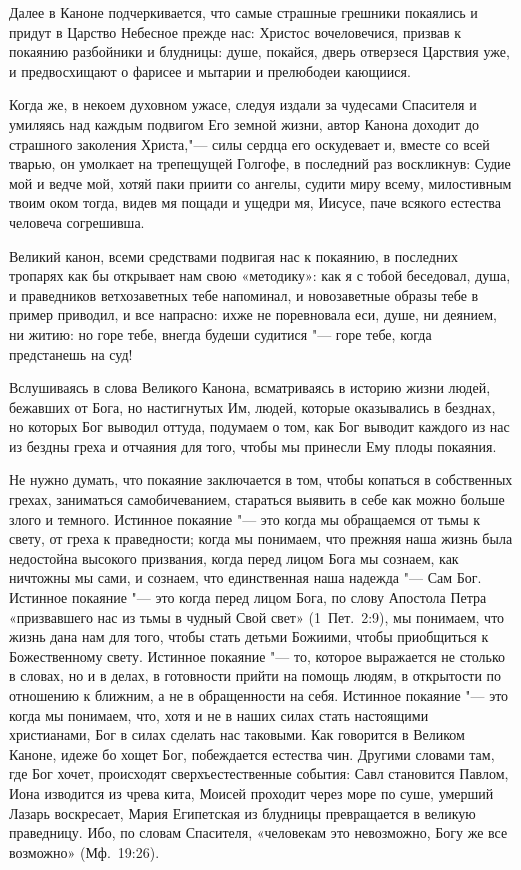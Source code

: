 \begin{mymulticols}
Далее в Каноне подчеркивается, что самые страшные грешники покаялись и придут в Царство Небесное прежде нас: Христос вочеловечися, призвав к покаянию разбойники и блудницы: душе, покайся, дверь отверзеся Царствия уже, и предвосхищают о фарисее и мытарии и прелюбодеи кающиися.

Когда же, в некоем духовном ужасе, следуя издали за чудесами Спасителя и умиляясь над каждым подвигом Его земной жизни, автор Канона доходит до страшного заколения Христа,"--- силы сердца его оскудевает и, вместе со всей тварью, он умолкает на трепещущей Голгофе, в последний раз воскликнув: Судие мой и ведче мой, хотяй паки приити со ангелы, судити миру всему, милостивным твоим оком тогда, видев мя пощади и ущедри мя, Иисусе, паче всякого естества человеча согрешивша.

Великий канон, всеми средствами подвигая нас к покаянию, в последних тропарях как бы открывает нам свою «методику»: как я с тобой беседовал, душа, и праведников ветхозаветных тебе напоминал, и новозаветные образы тебе в пример приводил, и все напрасно: ихже не поревновала еси, душе, ни деянием, ни житию: но горе тебе, внегда будеши судитися "--- горе тебе, когда предстанешь на суд!

Вслушиваясь в слова Великого Канона, всматриваясь в историю жизни людей, бежавших от Бога, но настигнутых Им, людей, которые оказывались в безднах, но которых Бог выводил оттуда, подумаем о том, как Бог выводит каждого из нас из бездны греха и отчаяния для того, чтобы мы принесли Ему плоды покаяния.

Не нужно думать, что покаяние заключается в том, чтобы копаться в собственных грехах, заниматься самобичеванием, стараться выявить в себе как можно больше злого и темного. Истинное покаяние "--- это когда мы обращаемся от тьмы к свету, от греха к праведности; когда мы понимаем, что прежняя наша жизнь была недостойна высокого призвания, когда перед лицом Бога мы сознаем, как ничтожны мы сами, и сознаем, что единственная наша надежда "--- Сам Бог. Истинное покаяние "--- это когда перед лицом Бога, по слову Апостола Петра «призвавшего нас из тьмы в чудный Свой свет» (\mbox{1 Пет. 2:9}), мы понимаем, что жизнь дана нам для того, чтобы стать детьми Божиими, чтобы приобщиться к Божественному свету. Истинное покаяние "--- то, которое выражается не столько в словах, но и в делах, в готовности прийти на помощь людям, в открытости по отношению к ближним, а не в обращенности на себя. Истинное покаяние "--- это когда мы понимаем, что, хотя и не в наших силах стать настоящими христианами, Бог в силах сделать нас таковыми. Как говорится в Великом Каноне, идеже бо хощет Бог, побеждается естества чин. Другими словами там, где Бог хочет, происходят сверхъестественные события: Савл становится Павлом, Иона изводится из чрева кита, Моисей проходит через море по суше, умерший Лазарь воскресает, Мария Египетская из блудницы превращается в великую праведницу. Ибо, по словам Спасителя, «человекам это невозможно, Богу же все возможно» (\mbox{Мф. 19:26}).


\end{mymulticols}
